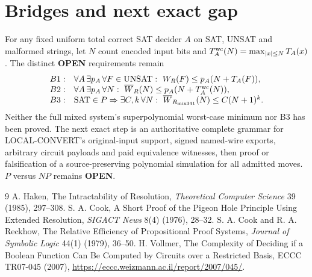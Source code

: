 \documentclass[11pt]{article}
\begin{document}
\section*{Bridges and next exact gap}
For any fixed uniform total correct SAT decider $A$ on SAT, UNSAT and malformed strings, let $N$ count encoded input bits and $T_A^{\rm wc}(N)=\max_{|x|\le N}T_A(x)$. The distinct \textbf{OPEN} requirements remain
\[
\begin{array}{ll}
B1:&\forall A\,\exists p_A\,\forall F\in\mathrm{UNSAT}:\ 
W_R(F)\le p_A(N+T_A(F)),\\
B2:&\forall A\,\exists p_A\,\forall N:\ 
\overline W_R(N)\le p_A(N+T_A^{\rm wc}(N)),\\
B3:&\mathrm{SAT}\in P\Rightarrow\exists C,k\,\forall N:\ 
\overline W_{R_{\mathrm{mix341}}}(N)\le C(N+1)^k.
\end{array}
\]
Neither the full mixed system's superpolynomial worst-case minimum nor B3 has been proved. The next exact step is an authoritative complete grammar for LOCAL-CONVERT's original-input support, signed named-wire exports, arbitrary circuit payloads and paid equivalence witnesses, then proof or falsification of a source-preserving polynomial simulation for all admitted moves. $P$ versus $NP$ remains \textbf{OPEN}.

\begin{thebibliography}{9}
\bibitem{haken} A. Haken, The Intractability of Resolution, \emph{Theoretical Computer Science} 39 (1985), 297--308.
 S. A. Cook, A Short Proof of the Pigeon Hole Principle Using Extended Resolution, \emph{SIGACT News} 8(4) (1976), 28--32.
\bibitem{cr} S. A. Cook and R. A. Reckhow, The Relative Efficiency of Propositional Proof Systems, \emph{Journal of Symbolic Logic} 44(1) (1979), 36--50.
\bibitem{vollmer} H. Vollmer, The Complexity of Deciding if a Boolean Function Can Be Computed by Circuits over a Restricted Basis, ECCC TR07-045 (2007), \url{https://eccc.weizmann.ac.il/report/2007/045/}.
\end{thebibliography}
\end{document}
